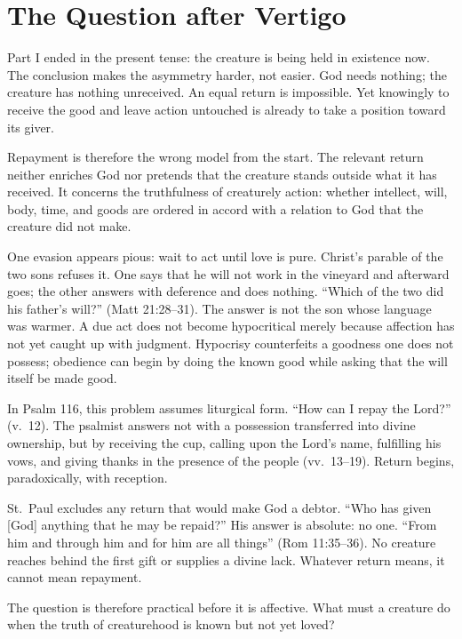 \section{The Question after Vertigo}

Part I ended in the present tense: the creature is being held in existence now. The conclusion makes the asymmetry harder, not easier. God needs nothing; the creature has nothing unreceived. An equal return is impossible. Yet knowingly to receive the good and leave action untouched is already to take a position toward its giver.

Repayment is therefore the wrong model from the start. The relevant return neither enriches God nor pretends that the creature stands outside what it has received. It concerns the truthfulness of creaturely action: whether intellect, will, body, time, and goods are ordered in accord with a relation to God that the creature did not make.

One evasion appears pious: wait to act until love is pure. Christ's parable of the two sons refuses it. One says that he will not work in the vineyard and afterward goes; the other answers with deference and does nothing. ``Which of the two did his father's will?'' (Matt 21:28--31). The answer is not the son whose language was warmer. A due act does not become hypocritical merely because affection has not yet caught up with judgment. Hypocrisy counterfeits a goodness one does not possess; obedience can begin by doing the known good while asking that the will itself be made good.

In Psalm 116, this problem assumes liturgical form. ``How can I repay the Lord?'' (v.~12). The psalmist answers not with a possession transferred into divine ownership, but by receiving the cup, calling upon the Lord's name, fulfilling his vows, and giving thanks in the presence of the people (vv.~13--19). Return begins, paradoxically, with reception.

St.~Paul excludes any return that would make God a debtor. ``Who has given [God] anything that he may be repaid?'' His answer is absolute: no one. ``From him and through him and for him are all things'' (Rom 11:35--36). No creature reaches behind the first gift or supplies a divine lack. Whatever return means, it cannot mean repayment.

The question is therefore practical before it is affective. What must a creature do when the truth of creaturehood is known but not yet loved?
